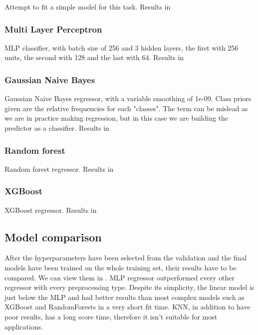 Attempt to fit a simple model for this task. Results in 




\subsubsection{Multi Layer Perceptron}

MLP classifier, with batch size of 256 and 3 hidden layers, the first with 256 units, the second with 128 and the last with 64. Results in %



\subsubsection{Gaussian Naive Bayes}

Gaussian Naive Bayes regressor, with a variable smoothing of 1e-09. Class priors given are the relative frequencies for each "classes". The term can be mislead as we are in practice making regression, but in this case we are building the predictor as a classifier.
Results in 




\subsubsection{Random forest}

Random forest regressor.
Results in 




\subsubsection{XGBoost}

XGBoost regressor.
Results in 



\subsection{Model comparison}

After the hyperparameters have been selected from the validation and the final models have been trained on the whole training set, their results have to be compared. We can view them in .
MLP regressor outperformed every other regressor with every preprocessing type. Despite its simplicity, the linear model is just below the MLP and had better results than most complex models such as XGBoost and RandomForests in a very short fit time. KNN, in addition to have poor results, has a long score time, therefore it isn't suitable for most applications.



